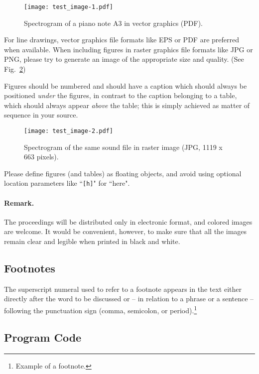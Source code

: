 \documentclass[runningheads,a4paper]{llncs}
\begin{document}
\begin{figure}
\centering
\texttt{[image: test\_image-1.pdf]}
\caption{Spectrogram of a piano note A3 in vector graphics (PDF).}
\label{fig:example_1}
\end{figure}

For line drawings, vector graphics file formats like EPS or PDF are preferred
when available. When including figures in raster graphics file formats like
JPG or PNG, please try to generate an image of the appropriate size and
quality. (See Fig.~\ref{fig:example_2})

Figures should be numbered and should have a caption which should always be
positioned \emph{under} the figures, in contrast to the caption belonging
to a table, which should always appear \emph{above} the table; this is
simply achieved as matter of sequence in your source.

\begin{figure}
\centering
\texttt{[image: test\_image-2.pdf]}
\caption{Spectrogram of the same sound file in raster image (JPG,
1119 x  663 pixels).}
\label{fig:example_2}
\end{figure}

Please define figures (and tables) as floating objects, and avoid using
optional location parameters like ``\verb+[h]+" for ``here".

\paragraph{Remark.}

The proceedings will be distributed only in electronic format, and colored
images are welcome. It would be convenient, however, to make sure that all
the images remain clear and legible when printed in black and white.

\subsection{Footnotes}

The superscript numeral used to refer to a footnote appears in the text
either directly after the word to be discussed or -- in relation to a
phrase or a sentence -- following the punctuation sign (comma, semicolon,
or period).\footnote{Example of a footnote.}

\subsection{Program Code}
\end{document}
